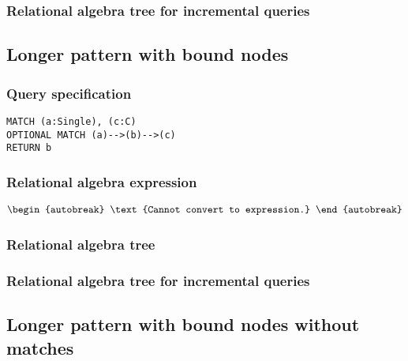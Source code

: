 
\subsubsection*{Relational algebra tree for incremental queries}


\subsection{Longer pattern with bound nodes}

\subsubsection*{Query specification}

\begin{lstlisting}
MATCH (a:Single), (c:C)
OPTIONAL MATCH (a)-->(b)-->(c)
RETURN b
\end{lstlisting}

\subsubsection*{Relational algebra expression}

\begin{align*}
\begin{autobreak}
\text{Cannot convert to expression.}
\end{autobreak}
\end{align*}

\subsubsection*{Relational algebra tree}


\subsubsection*{Relational algebra tree for incremental queries}


\subsection{Longer pattern with bound nodes without matches}

